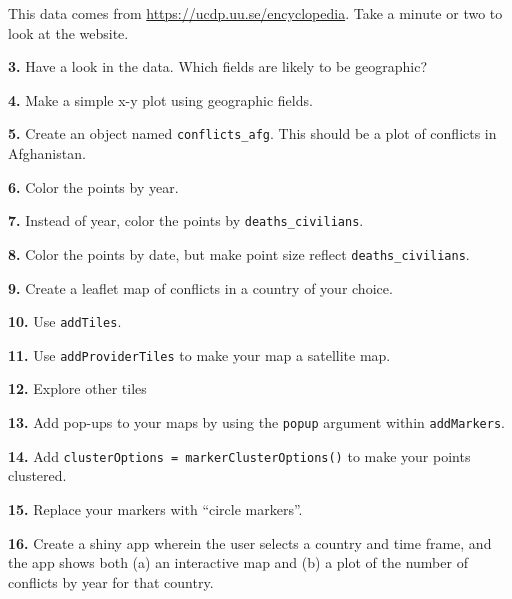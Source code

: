 \documentclass[
]{book}
\begin{document}
This data comes from \url{https://ucdp.uu.se/encyclopedia}. Take a minute or two to look at the website.

\textbf{3.} Have a look in the data. Which fields are likely to be geographic?

\textbf{4.} Make a simple x-y plot using geographic fields.

\textbf{5.} Create an object named \texttt{conflicts\_afg}. This should be a plot of conflicts in Afghanistan.

\textbf{6.} Color the points by year.

\textbf{7.} Instead of year, color the points by \texttt{deaths\_civilians}.

\textbf{8.} Color the points by date, but make point size reflect \texttt{deaths\_civilians}.

\textbf{9.} Create a leaflet map of conflicts in a country of your choice.

\textbf{10.} Use \texttt{addTiles}.

\textbf{11.} Use \texttt{addProviderTiles} to make your map a satellite map.

\textbf{12.} Explore other tiles

\textbf{13.} Add pop-ups to your maps by using the \texttt{popup} argument within \texttt{addMarkers}.

\textbf{14.} Add \texttt{clusterOptions\ =\ markerClusterOptions()} to make your points clustered.

\textbf{15.} Replace your markers with ``circle markers''.

\textbf{16.} Create a shiny app wherein the user selects a country and time frame, and the app shows both (a) an interactive map and (b) a plot of the number of conflicts by year for that country.

  
\end{document}
